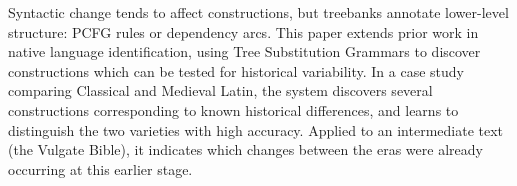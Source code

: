 Syntactic change tends to affect constructions, but treebanks annotate lower-level structure: PCFG rules or dependency arcs. This paper extends prior work in native language identification, using Tree Substitution Grammars to discover constructions which can be tested for historical variability. In a case study comparing Classical and Medieval Latin, the system discovers several constructions corresponding to known historical differences, and learns to distinguish the two varieties with high accuracy. Applied to an intermediate text (the Vulgate Bible), it indicates which changes between the eras were already occurring at this earlier stage.
